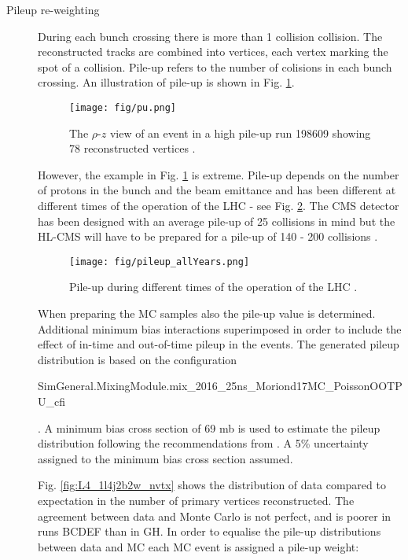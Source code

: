 \begin{description}

\item[Pileup re-weighting]

During each bunch crossing there is more than 1 \Pp\Pp collision collision. The reconstructed tracks are combined into vertices, each vertex marking the spot of a \Pp\Pp collision. Pile-up refers to the number of \Pp\Pp colisions in each bunch crossing. An illustration of pile-up is shown in Fig. \ref{fig:pu}.

\begin{figure}[htp]
\centering
\texttt{[image: fig/pu.png]}
\caption{The $\rho$-$z$ view of an event in a high pile-up run 198609 showing 78 reconstructed vertices \cite{Holzner:pu}.}
\label{fig:pu}
\end{figure}

However, the example in Fig. \ref{fig:pu} is extreme. Pile-up depends on the number of protons in the bunch and the beam emittance and has been different at different times of the operation of the LHC - see Fig. \ref{fig:pileup_allYears}. The CMS detector has been designed with an average pile-up of 25 collisions in mind but the HL-CMS will have to be prepared for a pile-up of 140 - 200 collisions \cite{Apollinari:2015bam}.

\begin{figure}[htp]
\centering
\texttt{[image: fig/pileup\_allYears.png]}
\caption{Pile-up during different times of the operation of the LHC \cite{twiki:pu_public}.}
\label{fig:pileup_allYears}
\end{figure}

When preparing the MC samples also the pile-up value is determined. Additional minimum bias interactions superimposed in order to include the effect of in-time and out-of-time pileup in the events. The generated pileup distribution is based on the configuration {\raggedright{\small SimGeneral.MixingModule.mix\_2016\_25ns\_Moriond17MC\_PoissonOOTPU\_cfi }}. A minimum bias cross section of 69 mb is used to estimate the pileup distribution following the recommendations from \cite{twiki:pileup}. A 5\% uncertainty assigned to the minimum bias cross section assumed.

Fig. \ref{fig:L4_1l4j2b2w_nvtx} shows the distribution of data compared to expectation in the number of primary vertices reconstructed. The agreement between data and Monte Carlo is not perfect, and is poorer in runs BCDEF than in GH. In order to equalise the pile-up distributions between data and MC each MC event is assigned a pile-up weight:


\end{description}
